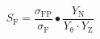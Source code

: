 \begin{equation}
S_{\mathrm{F}}\mathrm{=}\frac{{\sigma }_{\mathrm{FP}}}{{\sigma }_{\mathrm{F}}}\bullet \frac{Y_{\mathrm{N}}}{Y_{\mathrm{\theta }}\cdot Y_{\mathrm{Z}}}
\end{equation}